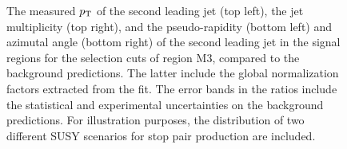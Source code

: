\begin{figure}[!ht]
\begin{center}
{    }
  \end{center}
  \caption[Kinematic distributions of the $\pt$ of the second leading jet, the jet multiplicity, and the pseudo-rapidity and azimutal angle of the second leading jet in the signal regions for the selection cuts of region M3, after the normalization factors extracted from the fit have been applied.]
{The measured $\pt$ of the second leading jet (top left), the jet multiplicity (top right), and the pseudo-rapidity (bottom left) and azimutal angle (bottom right) of the second leading jet in the signal regions for the selection cuts of region M3, compared to the background predictions. The latter include the global normalization factors extracted from the fit. The error bands in the ratios include the statistical and experimental uncertainties on the background predictions. For illustration purposes, the distribution of two different SUSY scenarios for stop pair production are included.}
  \label{fig:Plot_M3_SR_Jet2}
\end{figure}

